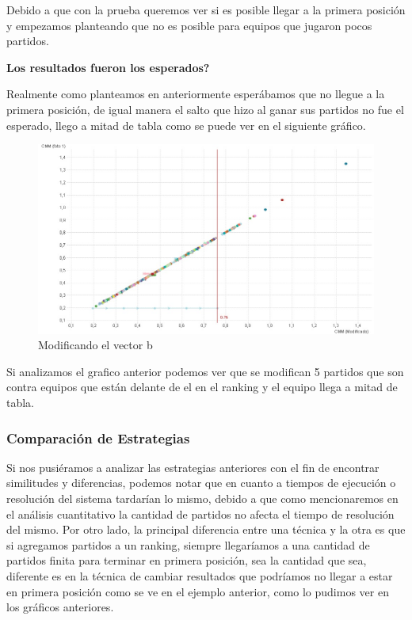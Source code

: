 Debido a que con la prueba queremos ver si es posible llegar a la primera posición y  empezamos planteando que no es posible para equipos que jugaron pocos partidos.

\textbf{Los resultados fueron los esperados?}

Realmente como planteamos en anteriormente esperábamos que no llegue a la primera posición, de igual manera el salto que hizo al ganar sus partidos no fue el esperado, llego a mitad de tabla como se puede ver en el siguiente gráfico.

\begin{figure}[H]
    \centering
    \includegraphics[width=1\textwidth]{IMG/modificandob.jpg}
    \caption{Modificando el vector b}
    \label{fig:Modificando partidos perdidos}
\end{figure}

Si analizamos el grafico anterior podemos ver que se modifican 5 partidos que son contra equipos que están delante de el en el ranking y el equipo llega a mitad de tabla.
\subsubsection{Comparación de Estrategias}
Si nos pusiéramos a analizar las estrategias anteriores con el fin de encontrar similitudes y diferencias, podemos notar que en cuanto a tiempos de ejecución o resolución del sistema tardarían lo mismo, debido a que como mencionaremos en el análisis cuantitativo la cantidad de partidos no afecta el tiempo de resolución del mismo.
Por otro lado, la principal diferencia entre una técnica y la otra es que si agregamos partidos a un ranking, siempre llegaríamos a una cantidad de partidos finita para terminar en primera posición, sea la cantidad que sea, diferente es en la técnica de cambiar resultados que podríamos no llegar a estar en primera posición como se ve en el ejemplo anterior, como lo pudimos ver en los gráficos anteriores.

